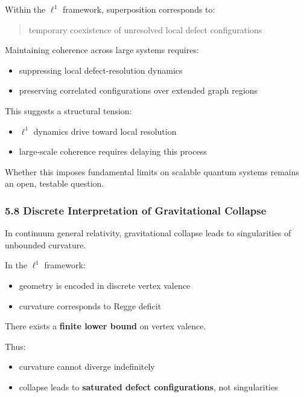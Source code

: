 \documentclass[
]{article}
\providecommand{\tightlist}{%
  \setlength{\itemsep}{0pt}\setlength{\parskip}{0pt}}
\begin{document}
Within the \(\ell^1\) framework, superposition corresponds to:

\begin{quote}
temporary coexistence of unresolved local defect configurations
\end{quote}

Maintaining coherence across large systems requires:

\begin{itemize}
\tightlist
\item
  suppressing local defect-resolution dynamics
\item
  preserving correlated configurations over extended graph regions
\end{itemize}

This suggests a structural tension:

\begin{itemize}
\tightlist
\item
  \(\ell^1\) dynamics drive toward local resolution
\item
  large-scale coherence requires delaying this process
\end{itemize}

Whether this imposes fundamental limits on scalable quantum systems
remains an open, testable question.

\hypertarget{discrete-interpretation-of-gravitational-collapse}{%
\subsubsection{5.8 Discrete Interpretation of Gravitational
Collapse}\label{discrete-interpretation-of-gravitational-collapse}}

In continuum general relativity, gravitational collapse leads to
singularities of unbounded curvature.

In the \(\ell^1\) framework:

\begin{itemize}
\tightlist
\item
  geometry is encoded in discrete vertex valence
\item
  curvature corresponds to Regge deficit
\end{itemize}

There exists a \textbf{finite lower bound} on vertex valence.

Thus:

\begin{itemize}
\tightlist
\item
  curvature cannot diverge indefinitely
\item
  collapse leads to \textbf{saturated defect configurations}, not
  singularities
\end{itemize}
\end{document}

